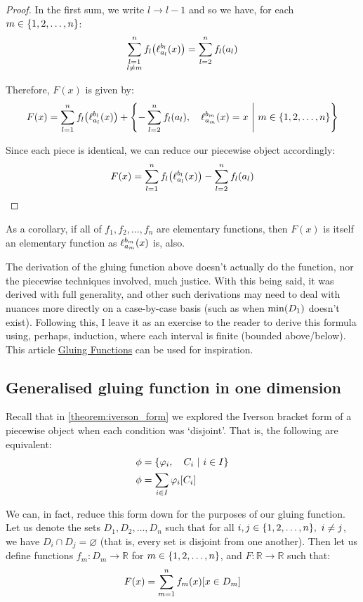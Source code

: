 \begin{proof}
    In the first sum, we write $l\to l-1$ and so we have, for each $m\in\{1,2,\dots,n\}$:
    $$
        \sum_{\substack{l=1\\l\neq m}}^{n}{f_l\paren*{\ell_{a_l}^{b_l}\paren{x}}} = \sum_{l=2}^{n}{f_{l}\paren*{a_{l}}}
    $$

    Therefore, $F(x)$ is given by:
    $$
        F(x) = \sum_{l=1}^{n}{f_l\paren*{\ell_{a_l}^{b_l}\paren{x}}}+\pwobj{-\sum_{l=2}^{n}{f_{l}\paren*{a_{l}}}}{\ell_{a_m}^{b_m}\paren{x}=x}{m\in\br{1,2,\dots,n}}
    $$

    Since each piece is identical, we can reduce our piecewise object accordingly:
    $$
        F(x) = \sum_{l=1}^{n}{f_l\paren*{\ell_{a_l}^{b_l}\paren{x}}}-\sum_{l=2}^{n}{f_{l}\paren*{a_{l}}}
    $$
\end{proof}

As a corollary, if all of $f_1,f_2,\dots,f_n$ are elementary functions, then $F(x)$ is itself an elementary function as $\ell_{a_m}^{b_m}(x)$ is, also.

The derivation of the gluing function above doesn't actually do the function, nor the piecewise techniques involved, much justice. With this being said, it was derived with full generality, and other such derivations may need to deal with nuances more directly on a case-by-case basis (such as when $\min(D_1)$ doesn't exist). Following this, I leave it as an exercise to the reader to derive this formula using, perhaps, induction, where each interval is finite (bounded above/below). This article \href{https://piecewise.org/exploration/gluing-functions}{Gluing Functions} can be used for inspiration.

\subsection{Generalised gluing function in one dimension}
Recall that in \ref{theorem:iverson_form} we explored the Iverson bracket form of a piecewise object when each condition was `disjoint'. That is, the following are equivalent:
\begin{align*}
    \phi &= \left\{\varphi_i,\quad C_i\ \middle|\ i\in I\right\} \\
    \phi &= \sum_{i\in I}{\varphi_i[C_i]}
\end{align*}

We can, in fact, reduce this form down for the purposes of our gluing function. Let us denote the sets $D_1,D_2,\dots,D_n$ such that for all $i,j\in\br{1,2,\dots,n},\ i\neq j$, we have $D_i\cap D_j=\varnothing$ (that is, every set is disjoint from one another). Then let us define functions $f_m:D_m\to\mathbb{R}$ for $m\in\{1,2,\dots,n\}$, and $F:\mathbb{R}\to\mathbb{R}$ such that:
$$
    F(x) = \sum_{m=1}^{n}{f_m(x)[x\in D_m]}
$$

